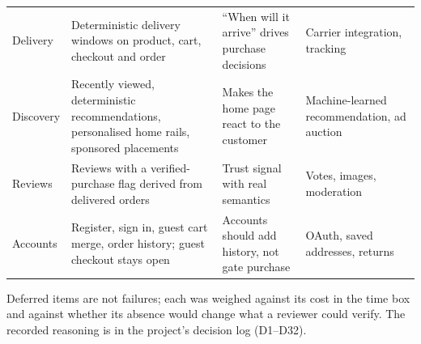 \begin{table}[H]
\begin{tabularx}{\linewidth}{@{}p{2.4cm}XXX@{}}
Delivery & Deterministic delivery windows on product, cart, checkout and order & ``When will it arrive'' drives purchase decisions & Carrier integration, tracking \\
Discovery & Recently viewed, deterministic recommendations, personalised home rails, sponsored placements & Makes the home page react to the customer & Machine-learned recommendation, ad auction \\
Reviews & Reviews with a verified-purchase flag derived from delivered orders & Trust signal with real semantics & Votes, images, moderation \\
Accounts & Register, sign in, guest cart merge, order history; guest checkout stays open & Accounts should add history, not gate purchase & OAuth, saved addresses, returns \\
\bottomrule
\end{tabularx}
\end{table}

Deferred items are not failures; each was weighed against its cost in the time box and against whether its absence would change what a reviewer could verify. The recorded reasoning is in the project's decision log (D1--D32).
